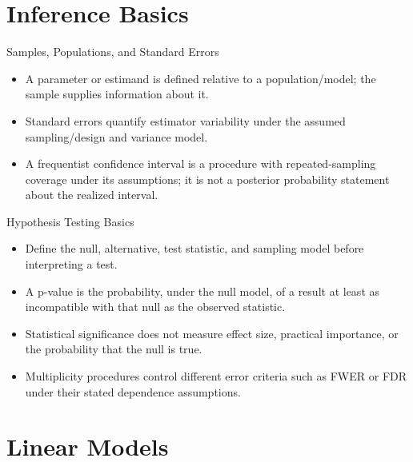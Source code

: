 \documentclass[aspectratio=169]{beamer}
\begin{document}
\section{Inference Basics}

\begin{frame}{Samples, Populations, and Standard Errors}
\begin{itemize}
  \item A parameter or estimand is defined relative to a population/model; the sample supplies information about it.
  \item Standard errors quantify estimator variability under the assumed sampling/design and variance model.
  \item A frequentist confidence interval is a procedure with repeated-sampling coverage under its assumptions; it is not a posterior probability statement about the realized interval.
\end{itemize}
\end{frame}

\begin{frame}{Hypothesis Testing Basics}
\begin{itemize}
  \item Define the null, alternative, test statistic, and sampling model before interpreting a test.
  \item A p-value is the probability, under the null model, of a result at least as incompatible with that null as the observed statistic.
  \item Statistical significance does not measure effect size, practical importance, or the probability that the null is true.
  \item Multiplicity procedures control different error criteria such as FWER or FDR under their stated dependence assumptions.
\end{itemize}
\end{frame}

\section{Linear Models}
\end{document}
